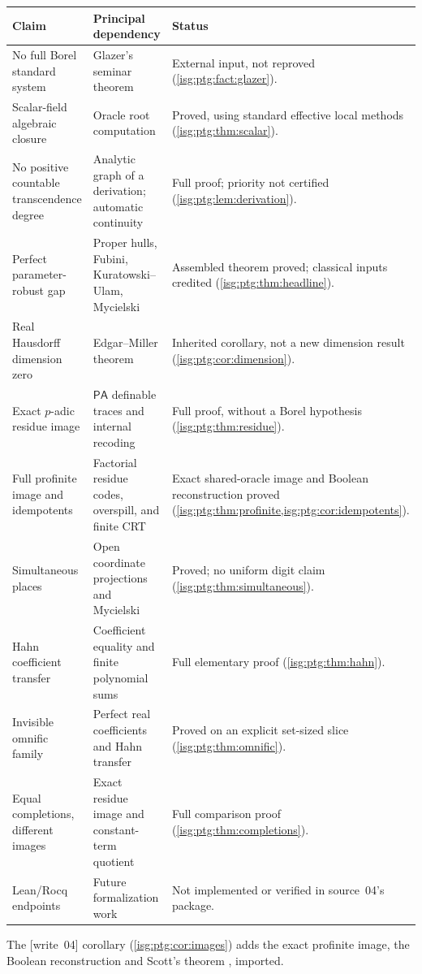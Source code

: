 \documentclass[11pt]{article}
\theoremstyle{definition}
\theoremstyle{remark}
\newcommand{\PA}{\mathsf{PA}}
\begin{document}
\begin{longtable}{@{}>{\raggedright\arraybackslash}p{}>{\raggedright\arraybackslash}p{}>{\raggedright\arraybackslash}p{}@{}}
\toprule
Claim & Principal dependency & Status \\
\midrule
\endhead
No full Borel standard system & Glazer's seminar theorem & External input, not reproved (\cref{isg:ptg:fact:glazer}). \\
Scalar-field algebraic closure & Oracle root computation & Proved, using standard effective local methods (\cref{isg:ptg:thm:scalar}). \\
No positive countable transcendence degree & Analytic graph of a derivation; automatic continuity & Full proof; priority not certified (\cref{isg:ptg:lem:derivation}). \\
Perfect parameter-robust gap & Proper hulls, Fubini, Kuratowski--Ulam, Mycielski & Assembled theorem proved; classical inputs credited (\cref{isg:ptg:thm:headline}). \\
Real Hausdorff dimension zero & Edgar--Miller theorem & Inherited corollary, not a new dimension result (\cref{isg:ptg:cor:dimension}). \\
Exact $p$-adic residue image & $\PA$ definable traces and internal recoding & Full proof, without a Borel hypothesis (\cref{isg:ptg:thm:residue}). \\
Full profinite image and idempotents & Factorial residue codes, overspill, and finite CRT & Exact shared-oracle image and Boolean reconstruction proved (\cref{isg:ptg:thm:profinite,isg:ptg:cor:idempotents}). \\
Simultaneous places & Open coordinate projections and Mycielski & Proved; no uniform digit claim (\cref{isg:ptg:thm:simultaneous}). \\
Hahn coefficient transfer & Coefficient equality and finite polynomial sums & Full elementary proof (\cref{isg:ptg:thm:hahn}). \\
Invisible omnific family & Perfect real coefficients and Hahn transfer & Proved on an explicit set-sized slice (\cref{isg:ptg:thm:omnific}). \\
Equal completions, different images & Exact residue image and constant-term quotient & Full comparison proof (\cref{isg:ptg:thm:completions}). \\
Lean/Rocq endpoints & Future formalization work & Not implemented or verified in source~04's package. \\
\bottomrule
\end{longtable}
\endgroup
\noindent The \textup{[write~04]} corollary (\cref{isg:ptg:cor:images})
adds the exact profinite image, the Boolean reconstruction and Scott's
theorem \cite{Scott}, imported.
\end{document}
